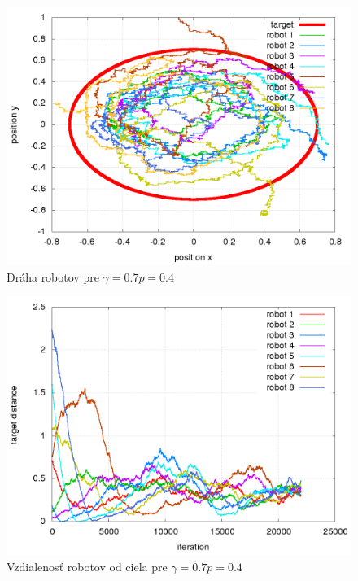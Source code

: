 \begin{figure}[!htb]
\centering
\includegraphics[scale=.4]{../../results_q_learning/nano_q_learning/result_04_02/robot_path.png}
\caption{Dráha robotov pre $\gamma = 0.7 p = 0.4$}
\label{img:nano_q_result_04_2_path}
\end{figure}

\begin{figure}[!htb]
\centering
\includegraphics[scale=.4]{../../results_q_learning/nano_q_learning/result_04_02/robot_reward.png}
\caption{Vzdialenosť robotov od cieľa pre $\gamma = 0.7 p = 0.4$}
\label{img:nano_q_result_04_2_error}
\end{figure}


